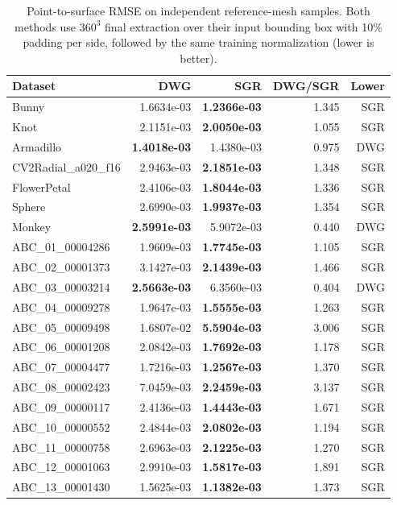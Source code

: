 \begin{table}[t]
\centering
\caption{Point-to-surface RMSE on independent reference-mesh samples. Both methods use $360^3$ final extraction over their input bounding box with 10\% padding per side, followed by the same training normalization (lower is better).}
\label{tab:dwg-rmse}
\begin{tabular}{lrrrr}
\toprule
Dataset & DWG & SGR & DWG/SGR & Lower \\
\midrule
Bunny & 1.6634e-03 & \textbf{1.2366e-03} & 1.345 & SGR \\
Knot & 2.1151e-03 & \textbf{2.0050e-03} & 1.055 & SGR \\
Armadillo & \textbf{1.4018e-03} & 1.4380e-03 & 0.975 & DWG \\
CV2Radial\_a020\_f16 & 2.9463e-03 & \textbf{2.1851e-03} & 1.348 & SGR \\
FlowerPetal & 2.4106e-03 & \textbf{1.8044e-03} & 1.336 & SGR \\
Sphere & 2.6990e-03 & \textbf{1.9937e-03} & 1.354 & SGR \\
Monkey & \textbf{2.5991e-03} & 5.9072e-03 & 0.440 & DWG \\
ABC\_01\_00004286 & 1.9609e-03 & \textbf{1.7745e-03} & 1.105 & SGR \\
ABC\_02\_00001373 & 3.1427e-03 & \textbf{2.1439e-03} & 1.466 & SGR \\
ABC\_03\_00003214 & \textbf{2.5663e-03} & 6.3560e-03 & 0.404 & DWG \\
ABC\_04\_00009278 & 1.9647e-03 & \textbf{1.5555e-03} & 1.263 & SGR \\
ABC\_05\_00009498 & 1.6807e-02 & \textbf{5.5904e-03} & 3.006 & SGR \\
ABC\_06\_00001208 & 2.0842e-03 & \textbf{1.7692e-03} & 1.178 & SGR \\
ABC\_07\_00004477 & 1.7216e-03 & \textbf{1.2567e-03} & 1.370 & SGR \\
ABC\_08\_00002423 & 7.0459e-03 & \textbf{2.2459e-03} & 3.137 & SGR \\
ABC\_09\_00000117 & 2.4136e-03 & \textbf{1.4443e-03} & 1.671 & SGR \\
ABC\_10\_00000552 & 2.4844e-03 & \textbf{2.0802e-03} & 1.194 & SGR \\
ABC\_11\_00000758 & 2.6963e-03 & \textbf{2.1225e-03} & 1.270 & SGR \\
ABC\_12\_00001063 & 2.9910e-03 & \textbf{1.5817e-03} & 1.891 & SGR \\
ABC\_13\_00001430 & 1.5625e-03 & \textbf{1.1382e-03} & 1.373 & SGR \\

\end{tabular}
\end{table}
